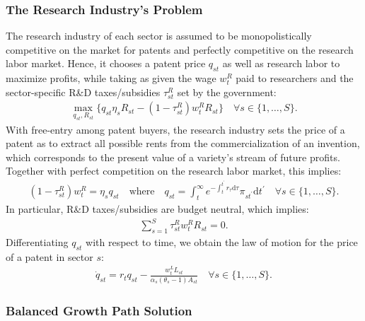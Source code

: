 \documentclass[12pt]{article}
\begin{document}
\subsubsection{The Research Industry's Problem}
\label{appendix:research industry problem}

The research industry of each sector is assumed to be monopolistically competitive on the market for patents and perfectly competitive on the research labor market. Hence, it chooses a patent price $q_{st}$ as well as research labor to maximize profits, while taking as given the wage $w_t^R$ paid to researchers and the sector-specific R\&D taxes/subsidies $\tau_{st}^R$ set by the government:
\begin{align*}
\max_{q_{st}, R_{st}}\{q_{st} \eta_s R_{st} - (1 - \tau_{st}^R) w_t^R R_{st}\} \quad \forall s \in \{1, \ldots, S\}.
\end{align*}
With free-entry among patent buyers, the research industry sets the price of a patent as to extract all possible rents from the commercialization of an invention, which corresponds to the present value of a variety's stream of future profits. Together with perfect competition on the research labor market, this implies:
\begin{align*}
(1 - \tau_{st}^R) w_t^R = \eta_s q_{st} \quad \text{where} \quad q_{st} = \int_t^{\infty} e^{-\int_t^{t^{\prime}} r_{\tau} \text{d}\tau} \pi_{st^{\prime}} \text{d}t^{\prime} \quad \forall s \in \{1, \ldots, S\}.
\end{align*}
In particular, R\&D taxes/subsidies are budget neutral, which implies:
\begin{align*}
\sum_{s = 1}^S \tau_{st}^R w_t^R R_{st} = 0.
\end{align*}
Differentiating $q_{st}$ with respect to time, we obtain the law of motion for the price of a patent in sector $s$:
\begin{align*}
\dot{q}_{st} = r_t q_{st} - \frac{w_t^L L_{st}}{\alpha_s (\theta_s - 1) A_{st}} \quad \forall s \in \{1, \ldots, S\}.
\end{align*}

\subsubsection{Balanced Growth Path Solution}
\label{appendix:BGP solution}
\end{document}
